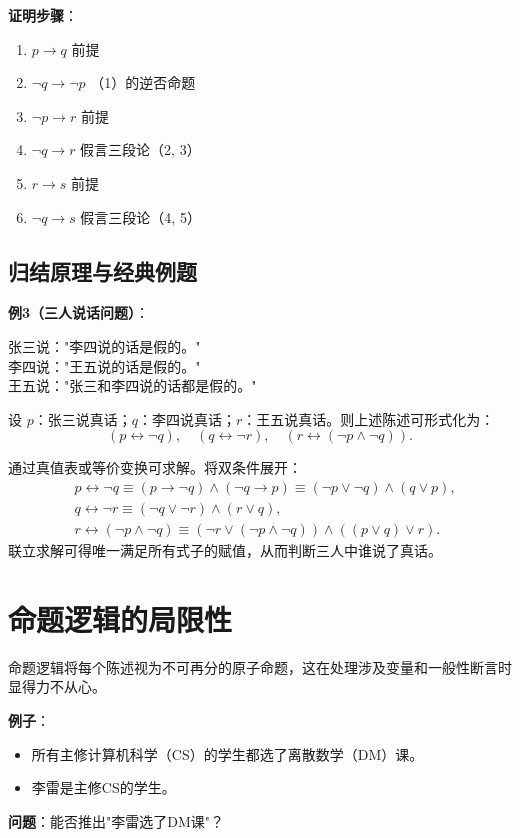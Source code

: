 \documentclass[UTF8,11pt,a4paper]{ctexbook}   %
\theoremstyle{definition}
\begin{document}
\textbf{证明步骤}：
\begin{enumerate}
    \item $p\to q$ \hfill 前提
    \item $\neg q\to\neg p$ \hfill （1）的逆否命题
    \item $\neg p\to r$ \hfill 前提
    \item $\neg q\to r$ \hfill 假言三段论（2, 3）
    \item $r\to s$ \hfill 前提
    \item $\neg q\to s$ \hfill 假言三段论（4, 5）
\end{enumerate}

\subsection{归结原理与经典例题}

\textbf{例3（三人说话问题）}：

张三说："李四说的话是假的。"\\
李四说："王五说的话是假的。"\\
王五说："张三和李四说的话都是假的。"

设 $p$：张三说真话；$q$：李四说真话；$r$：王五说真话。则上述陈述可形式化为：
\[
(p\leftrightarrow\neg q),\quad (q\leftrightarrow\neg r),\quad (r\leftrightarrow(\neg p\land\neg q)).
\]

通过真值表或等价变换可求解。将双条件展开：
\[
\begin{aligned}
& p\leftrightarrow\neg q \equiv (p\to\neg q)\land(\neg q\to p)\equiv(\neg p\lor\neg q)\land(q\lor p),\\
& q\leftrightarrow\neg r \equiv (\neg q\lor\neg r)\land(r\lor q),\\
& r\leftrightarrow(\neg p\land\neg q) \equiv (\neg r\lor(\neg p\land\neg q))\land((p\lor q)\lor r).
\end{aligned}
\]
联立求解可得唯一满足所有式子的赋值，从而判断三人中谁说了真话。

\section{命题逻辑的局限性}

命题逻辑将每个陈述视为不可再分的原子命题，这在处理涉及变量和一般性断言时显得力不从心。

\textbf{例子}：
\begin{itemize}
    \item 所有主修计算机科学（CS）的学生都选了离散数学（DM）课。
    \item 李雷是主修CS的学生。
\end{itemize}
\textbf{问题}：能否推出"李雷选了DM课"？
\end{document}
